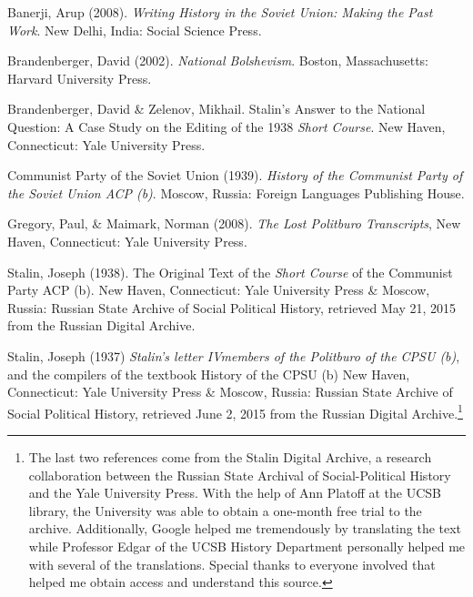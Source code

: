 \documentclass[a4paper, twocolumn]{article}
\begin{document}
\begin{thebibliography}{10}
\setlength{\itemindent}{-0.3in}

\bibitem{}  Banerji, Arup (2008). \emph{Writing History in the Soviet Union: Making the
Past Work}. New Delhi, India: Social Science Press.

\bibitem{}  Brandenberger, David (2002). \emph{National Bolshevism}. Boston,
Massachusetts: Harvard University Press.

\bibitem{}  Brandenberger, David \& Zelenov, Mikhail. Stalin’s Answer to the
National Question: A Case Study on the Editing of the 1938 \emph{Short
  Course}. New Haven, Connecticut: Yale University Press.

\bibitem{}  Communist Party of the Soviet Union (1939). \emph{History of the Communist
Party of the Soviet Union ACP (b)}. Moscow, Russia: Foreign Languages
Publishing House.

\bibitem{}  Gregory, Paul, \& Maimark, Norman (2008). \emph{The Lost Politburo
Transcripts}, New Haven, Connecticut: Yale University Press.

\bibitem{}  Stalin, Joseph (1938). The Original Text of the \emph{Short Course} of
the Communist Party ACP (b). New Haven, Connecticut: Yale University
Press \& Moscow, Russia: Russian State Archive of Social Political
History, retrieved May 21, 2015 from the Russian Digital Archive.


\bibitem{}  Stalin, Joseph (1937) \emph{Stalin's letter IVmembers of the Politburo of
the CPSU (b)}, and the compilers of the textbook History of the CPSU
(b) New Haven, Connecticut: Yale University Press \& Moscow, Russia:
Russian State Archive of Social Political History, retrieved June 2,
2015 from the Russian Digital Archive.\footnote[1]{
The last two references come from the Stalin Digital Archive, a
research collaboration between the Russian State Archival of
Social-Political History and the Yale University Press. With the help
of Ann Platoff at the UCSB library, the University was able to obtain
a one-month free trial to the archive. Additionally, Google helped me
tremendously by translating the text while Professor Edgar of the UCSB
History Department personally helped me with several of the
translations. Special thanks to everyone involved that helped me
obtain access and understand this source.
}
\end{thebibliography}
\end{document}

